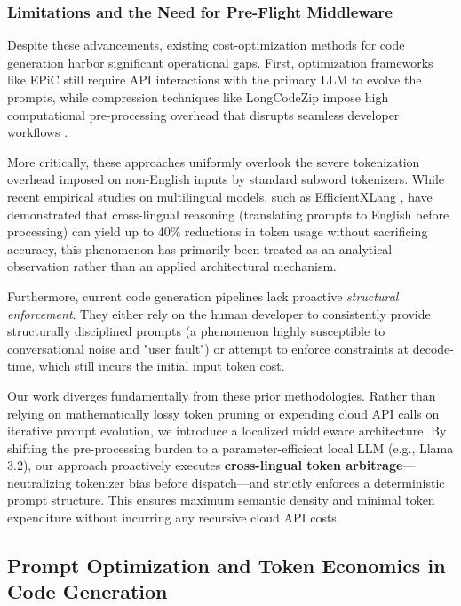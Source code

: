 \documentclass[11pt,a4paper,twocolumn]{article}
\begin{document}
\subsubsection*{Limitations and the Need for Pre-Flight Middleware}

Despite these advancements, existing cost-optimization methods for code generation harbor significant operational gaps. First, optimization frameworks like EPiC still require API interactions with the primary LLM to evolve the prompts, while compression techniques like LongCodeZip impose high computational pre-processing overhead that disrupts seamless developer workflows \cite{shi2025longcodezip}. 

More critically, these approaches uniformly overlook the severe tokenization overhead imposed on non-English inputs by standard subword tokenizers. While recent empirical studies on multilingual models, such as EfficientXLang \cite{ahuja2025efficientxlang}, have demonstrated that cross-lingual reasoning (translating prompts to English before processing) can yield up to 40\% reductions in token usage without sacrificing accuracy, this phenomenon has primarily been treated as an analytical observation rather than an applied architectural mechanism. 

Furthermore, current code generation pipelines lack proactive \textit{structural enforcement}. They either rely on the human developer to consistently provide structurally disciplined prompts (a phenomenon highly susceptible to conversational noise and "user fault") or attempt to enforce constraints at decode-time, which still incurs the initial input token cost. 

Our work diverges fundamentally from these prior methodologies. Rather than relying on mathematically lossy token pruning or expending cloud API calls on iterative prompt evolution, we introduce a localized middleware architecture. By shifting the pre-processing burden to a parameter-efficient local LLM (e.g., Llama 3.2), our approach proactively executes \textbf{cross-lingual token arbitrage}—neutralizing tokenizer bias before dispatch—and strictly enforces a deterministic prompt structure. This ensures maximum semantic density and minimal token expenditure without incurring any recursive cloud API costs.

\subsection{Prompt Optimization and Token Economics in Code Generation}
\end{document}
